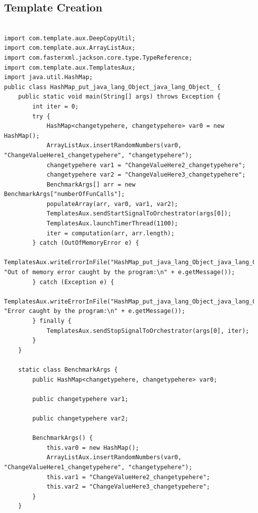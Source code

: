 \subsection{Template Creation} \label{sec:work_stage1_template_creation}


\FloatBarrier


\begin{verbatim}

import com.template.aux.DeepCopyUtil;
import com.template.aux.ArrayListAux;
import com.fasterxml.jackson.core.type.TypeReference;
import com.template.aux.TemplatesAux;
import java.util.HashMap;
public class HashMap_put_java_lang_Object_java_lang_Object_ {
    public static void main(String[] args) throws Exception {
        int iter = 0;
        try {
            HashMap<changetypehere, changetypehere> var0 = new HashMap();
            ArrayListAux.insertRandomNumbers(var0, "ChangeValueHere1_changetypehere", "changetypehere");
            changetypehere var1 = "ChangeValueHere2_changetypehere";
            changetypehere var2 = "ChangeValueHere3_changetypehere";
            BenchmarkArgs[] arr = new BenchmarkArgs["numberOfFunCalls"];
            populateArray(arr, var0, var1, var2);
            TemplatesAux.sendStartSignalToOrchestrator(args[0]);
            TemplatesAux.launchTimerThread(1100);
            iter = computation(arr, arr.length);
        } catch (OutOfMemoryError e) {
            TemplatesAux.writeErrorInFile("HashMap_put_java_lang_Object_java_lang_Object_", "Out of memory error caught by the program:\n" + e.getMessage());
        } catch (Exception e) {
            TemplatesAux.writeErrorInFile("HashMap_put_java_lang_Object_java_lang_Object_", "Error caught by the program:\n" + e.getMessage());
        } finally {
            TemplatesAux.sendStopSignalToOrchestrator(args[0], iter);
        }
    }

    static class BenchmarkArgs {
        public HashMap<changetypehere, changetypehere> var0;

        public changetypehere var1;

        public changetypehere var2;

        BenchmarkArgs() {
            this.var0 = new HashMap();
            ArrayListAux.insertRandomNumbers(var0, "ChangeValueHere1_changetypehere", "changetypehere");
            this.var1 = "ChangeValueHere2_changetypehere";
            this.var2 = "ChangeValueHere3_changetypehere";
        }
    }


\end{verbatim}

